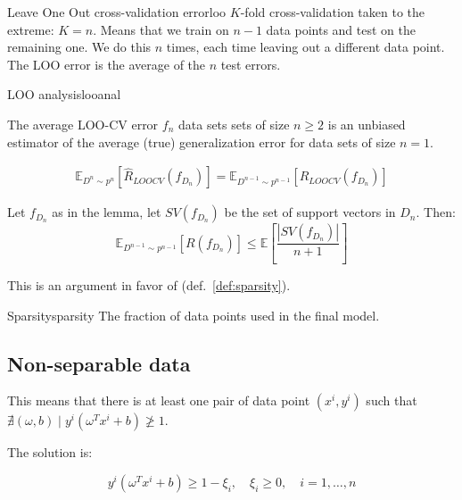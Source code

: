 \begin{definition}{Leave One Out cross-validation error}{loo}
	$K$-fold cross-validation taken to the extreme: $K=n$.
	Means that we train on $n-1$ data points and test on the remaining one.
	We do this $n$ times, each time leaving out a different data point.
	The LOO error is the average of the $n$ test errors.
\end{definition}

\begin{theorem}{LOO analysis}{looanal}
	\begin{lemma}{
			The average LOO-CV error $f_n$ data sets sets of size $n \geq 2$
			is an unbiased estimator of the average (true) generalization
			error for data sets of size $n=1$.
		}

		\begin{align*}
			\mathds{E}_{D^n \sim p^n}
			\left[ \hat{R}_{LOOCV}(f_{D_n}) \right] =
			\mathds{E}_{D^{n-1} \sim p^{n-1}} \left[{R_{LOOCV}(f_{D_n})} \right]
		\end{align*}
	\end{lemma}

	Let $f_{D_n}$ as in the lemma, let $SV(f_{D_n})$ be the set of
	support vectors in $D_n$. Then:
	\begin{equation*}
		\mathds{E}_{D^{n-1} \sim p^{n-1}} \left[{R(f_{D_n})} \right]
		\leq \mathds{E} \left[
			\frac{\left| SV(f_{D_n}) \right|}{n + 1}
			\right]
	\end{equation*}

	This is an argument in favor of  (def.~\ref{def:sparsity}).
\end{theorem}

\begin{definition}{Sparsity}{sparsity}
	The fraction of data points used in the final model.
\end{definition}

\subsection*{Non-separable data}

This means that there is at least one pair of data point $(x^i, y^i)$
such that $\nexists (\omega, b) \mid y^i (\omega^T x^i + b) \ngeq 1$.

The solution is:

\begin{equation*}
	y^i (\omega^T x^i + b) \geq 1 - \xi_i, \quad \xi_i \geq 0,\quad
	i=1,\dots,n
\end{equation*}

